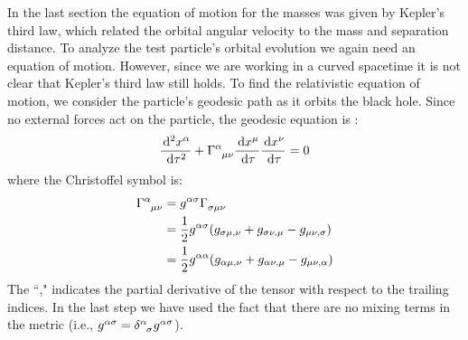 In the last section the equation of motion for the masses was given by Kepler's third law, which related the orbital angular velocity to the mass and separation distance. To analyze the test particle's orbital evolution we again need an equation of motion. However, since we are working in a curved spacetime it is not clear that Kepler's third law still holds. To find the relativistic equation of motion, we consider the particle's geodesic path as it orbits the black hole. Since no external forces act on the particle, the geodesic equation is \cite{ref:MTW, ref:Schutz, ref:Carroll}:
\begin{equation}
\frac{\d^2 x^{\alpha}}{\d \tau^2} + \Gamma\indices{^\alpha_{\mu \nu}} \frac{\d x^{\mu}}{\d\tau} \frac{\d x^{\nu}}{\d\tau} = 0
\end{equation}
where the Christoffel symbol is:
\begin{align}
\label{eqn:christoffel_symbols}
\Gamma\indices{^\alpha_{\mu\nu}} &= g^{\alpha\sigma}\Gamma\indices{_{\sigma\mu\nu}} \nonumber \\
    &= \frac{1}{2}g^{\alpha\sigma}( g_{\sigma\mu,\nu} + g_{\sigma\nu,\mu} - g_{\mu\nu,\sigma}) \nonumber \\
    &= \frac{1}{2}g^{\alpha\alpha}(g_{\alpha\mu,\nu} + g_{\alpha\nu,\mu} - g_{\mu\nu,\alpha})
\end{align}
The ``," indicates the partial derivative of the tensor with respect to the trailing indices. In the last step we have used the fact that there are no mixing terms in the metric (i.e., $g^{\alpha\sigma} = \delta\indices{^{\alpha}_\sigma}g^{\alpha\sigma}$). 

